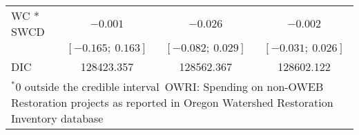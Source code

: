 \begin{table}
\begin{center}
\begin{tabular}{l c c c }
WC * SWCD        & $-0.001$            & $-0.026$            & $-0.002$            \\
                 & $[-0.165;\ 0.163]$  & $[-0.082;\ 0.029]$  & $[-0.031;\ 0.026]$  \\
\hline
DIC              & 128423.357          & 128562.367          & 128602.122          \\
\hline
\multicolumn{4}{l}{\scriptsize{$^* 0$ outside the credible interval\
       OWRI: Spending on non-OWEB Restoration projects as reported in Oregon Watershed Restoration Inventory database}}
\end{tabular}
\label{table:basemods}
\end{center}
\end{table}
